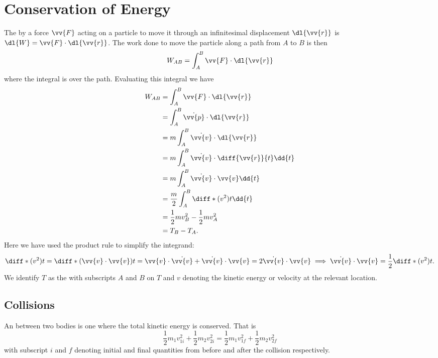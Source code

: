     \section{Conservation of Energy}
    The  by a force \(\vv{F}\) acting on a particle to move it through an infinitesimal displacement \(\dl{\vv{r}}\) is \(\dl{W} = \vv{F} \cdot \dl{\vv{r}}\).
    The work done to move the particle along a path from \(A\) to \(B\) is then
    \begin{equation}
        W_{AB} = \int_A^B \vv{F}\cdot\dl{\vv{r}}
    \end{equation}
    where the integral is over the path.
    Evaluating this integral we have
    \begin{align}
        W_{AB} &= \int_A^B \vv{F} \cdot \dl{\vv{r}}\\
        &= \int_A^B \dot{\vv{p}} \cdot \dl{\vv{r}}\\
        &= m\int_A^B \dot{\vv{v}} \cdot \dl{\vv{r}}\\
        &= m\int_A^B \dot{\vv{v}} \cdot \diff{\vv{r}}{t}\dd{t}\\
        &= m\int_A^B \dot{\vv{v}}\cdot\vv{v} \dd{t}\\
        &= \frac{m}{2}\int_A^B \diff*{(v^2)}{t} \dd{t}\\
        &= \frac{1}{2}mv_B^2  - \frac{1}{2}mv_A^2\\
        &= T_B - T_A.
    \end{align}
    Here we have used the product rule to simplify the integrand:
    \begin{equation}
        \diff*{(v^2)}{t} = \diff*{(\vv{v}\cdot\vv{v})}{t} = \vv{v}\cdot\dot{\vv{v}} + \dot{\vv{v}}\cdot\vv{v} = 2\dot{\vv{v}}\cdot\vv{v} \implies \dot{\vv{v}}\cdot\vv{v} = \frac{1}{2}\diff*{(v^2)}{t}.
    \end{equation}
    We identify \(T\) as the  with subscripts \(A\) and \(B\) on \(T\) and \(v\) denoting the kinetic energy or velocity at the relevant location.
    
    \subsection{Collisions}
    An  between two bodies is one where the total kinetic energy is conserved.
    That is
    \begin{equation}
        \frac{1}{2}m_1v_{1i}^2 + \frac{1}{2}m_2v_{2i}^2 = \frac{1}{2}m_1v_{1f}^2 + \frac{1}{2}m_2v_{2f}^2
    \end{equation}
    with subscript \(i\) and \(f\) denoting initial and final quantities from before and after the collision respectively.
    
